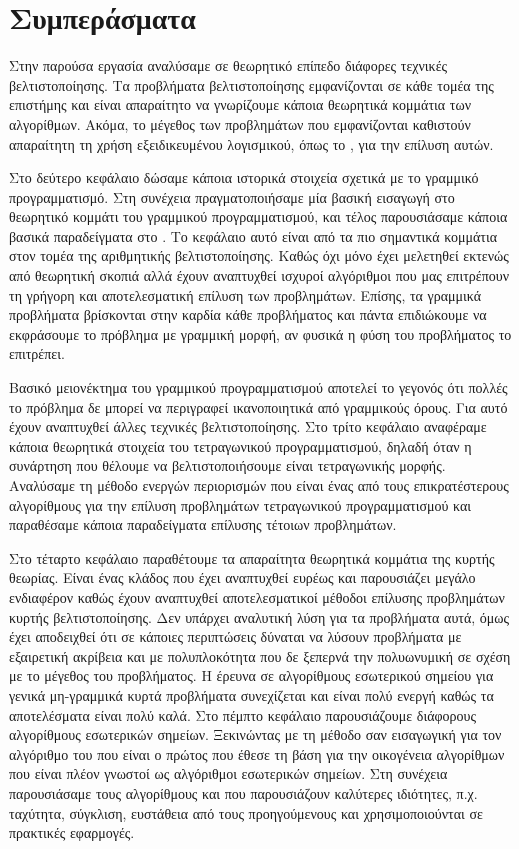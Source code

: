 \chapter{Συμπεράσματα}
Στην παρούσα εργασία αναλύσαμε σε θεωρητικό επίπεδο διάφορες τεχνικές
βελτιστοποίησης. Τα προβλήματα βελτιστοποίησης εμφανίζονται σε κάθε τομέα της
επιστήμης και είναι απαραίτητο να γνωρίζουμε κάποια θεωρητικά κομμάτια των
αλγορίθμων. Ακόμα, το μέγεθος των προβλημάτων που εμφανίζονται καθιστούν
απαραίτητη τη χρήση εξειδικευμένου λογισμικού, όπως το , για την
επίλυση αυτών.

Στο δεύτερο κεφάλαιο δώσαμε κάποια ιστορικά στοιχεία σχετικά με
το γραμμικό προγραμματισμό. Στη συνέχεια πραγματοποιήσαμε μία βασική εισαγωγή
στο θεωρητικό κομμάτι του γραμμικού προγραμματισμού, και τέλος παρουσιάσαμε
κάποια βασικά παραδείγματα στο . Το κεφάλαιο αυτό είναι από τα πιο
σημαντικά κομμάτια στον τομέα της αριθμητικής βελτιστοποίησης. Καθώς όχι μόνο έχει
μελετηθεί εκτενώς από θεωρητική σκοπιά αλλά έχουν αναπτυχθεί ισχυροί
αλγόριθμοι που μας επιτρέπουν τη γρήγορη και αποτελεσματική επίλυση των
προβλημάτων. Επίσης, τα γραμμικά προβλήματα βρίσκονται στην καρδία κάθε
προβλήματος και πάντα επιδιώκουμε να εκφράσουμε το πρόβλημα με γραμμική μορφή,
αν φυσικά η φύση του προβλήματος το επιτρέπει.

Βασικό μειονέκτημα του γραμμικού προγραμματισμού αποτελεί το γεγονός ότι πολλές
το πρόβλημα δε μπορεί να περιγραφεί ικανοποιητικά από γραμμικούς όρους. Για αυτό
έχουν αναπτυχθεί άλλες τεχνικές βελτιστοποίησης. Στο τρίτο κεφάλαιο αναφέραμε
κάποια θεωρητικά στοιχεία του τετραγωνικού προγραμματισμού, δηλαδή όταν η
συνάρτηση που θέλουμε να βελτιστοποιήσουμε είναι τετραγωνικής μορφής. Αναλύσαμε
τη μέθοδο ενεργών περιορισμών που είναι ένας από τους επικρατέστερους
αλγορίθμους για την επίλυση προβλημάτων τετραγωνικού προγραμματισμού και
παραθέσαμε κάποια παραδείγματα επίλυσης τέτοιων προβλημάτων.

Στο τέταρτο κεφάλαιο παραθέτουμε τα απαραίτητα θεωρητικά κομμάτια της κυρτής
θεωρίας. Είναι ένας κλάδος που έχει αναπτυχθεί ευρέως και παρουσιάζει μεγάλο
ενδιαφέρον καθώς έχουν αναπτυχθεί αποτελεσματικοί μέθοδοι επίλυσης προβλημάτων
κυρτής βελτιστοποίησης. Δεν υπάρχει αναλυτική λύση για τα προβλήματα αυτά, όμως έχει
αποδειχθεί ότι σε κάποιες περιπτώσεις δύναται να λύσουν προβλήματα με εξαιρετική
ακρίβεια και με πολυπλοκότητα που δε ξεπερνά την πολυωνυμική σε σχέση με το μέγεθος
του προβλήματος. Η έρευνα σε αλγορίθμους εσωτερικού σημείου για γενικά
μη-γραμμικά κυρτά προβλήματα συνεχίζεται και είναι πολύ ενεργή καθώς τα
αποτελέσματα είναι πολύ καλά. Στο πέμπτο κεφάλαιο παρουσιάζουμε διάφορους
αλγορίθμους εσωτερικών σημείων. Ξεκινώντας με τη μέθοδο  σαν
εισαγωγική για τον αλγόριθμο του  που είναι ο πρώτος που έθεσε τη
βάση για την οικογένεια αλγορίθμων που είναι πλέον γνωστοί ως αλγόριθμοι
εσωτερικών σημείων. Στη συνέχεια παρουσιάσαμε τους αλγορίθμους
 και  που παρουσιάζουν καλύτερες ιδιότητες,
π.χ. ταχύτητα, σύγκλιση, ευστάθεια από τους προηγούμενους και χρησιμοποιούνται
σε πρακτικές εφαρμογές.

